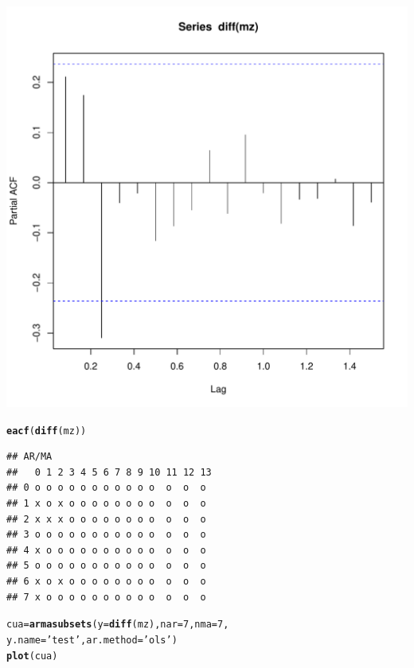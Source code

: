 \documentclass{article}\usepackage[]{graphicx}\usepackage[]{color}
\makeatletter
\def\maxwidth{ %
  \ifdim\Gin@nat@width>\linewidth
    \linewidth
  \else
    \Gin@nat@width
  \fi
}
\newcommand{\hlnum}[1]{\textcolor[rgb]{0.686,0.059,0.569}{#1}}%
\newcommand{\hlstr}[1]{\textcolor[rgb]{0.192,0.494,0.8}{#1}}%
\newcommand{\hlstd}[1]{\textcolor[rgb]{0.345,0.345,0.345}{#1}}%
\newcommand{\hlkwb}[1]{\textcolor[rgb]{0.69,0.353,0.396}{#1}}%
\newcommand{\hlkwc}[1]{\textcolor[rgb]{0.333,0.667,0.333}{#1}}%
\newcommand{\hlkwd}[1]{\textcolor[rgb]{0.737,0.353,0.396}{\textbf{#1}}}%
\newenvironment{kframe}{%
 \def\at@end@of@kframe{}%
 \ifinner\ifhmode%
  \def\at@end@of@kframe{\end{minipage}}%
  \begin{minipage}{\columnwidth}%
 \fi\fi%
 \def\FrameCommand##1{\hskip\@totalleftmargin \hskip-\fboxsep
 \colorbox{shadecolor}{##1}\hskip-\fboxsep
     \hskip-\linewidth \hskip-\@totalleftmargin \hskip\columnwidth}%
 \MakeFramed {\advance\hsize-\width
   \@totalleftmargin\z@ \linewidth\hsize
   \@setminipage}}%
 {\par\unskip\endMakeFramed%
 \at@end@of@kframe}
\newenvironment{knitrout}{}{} %
\makeatother
\begin{document}
\begin{knitrout}
\includegraphics[width=\maxwidth]{figure/unnamed-chunk-2-2} 
\begin{kframe}\begin{alltt}
\hlkwd{eacf}\hlstd{(}\hlkwd{diff}\hlstd{(mz))}
\end{alltt}
\begin{verbatim}
## AR/MA
##   0 1 2 3 4 5 6 7 8 9 10 11 12 13
## 0 o o o o o o o o o o o  o  o  o 
## 1 x o x o o o o o o o o  o  o  o 
## 2 x x x o o o o o o o o  o  o  o 
## 3 o o o o o o o o o o o  o  o  o 
## 4 x o o o o o o o o o o  o  o  o 
## 5 o o o o o o o o o o o  o  o  o 
## 6 x o x o o o o o o o o  o  o  o 
## 7 x o o o o o o o o o o  o  o  o
\end{verbatim}
\begin{alltt}
\hlstd{cua}\hlkwb{=}\hlkwd{armasubsets}\hlstd{(}\hlkwc{y}\hlstd{=}\hlkwd{diff}\hlstd{(mz),}\hlkwc{nar}\hlstd{=}\hlnum{7}\hlstd{,}\hlkwc{nma}\hlstd{=}\hlnum{7}\hlstd{,}
                \hlkwc{y.name}\hlstd{=}\hlstr{'test'}\hlstd{,} \hlkwc{ar.method}\hlstd{=}\hlstr{'ols'}\hlstd{)}
\hlkwd{plot}\hlstd{(cua)}
\end{alltt}
\end{kframe}

\end{knitrout}
\end{document}
